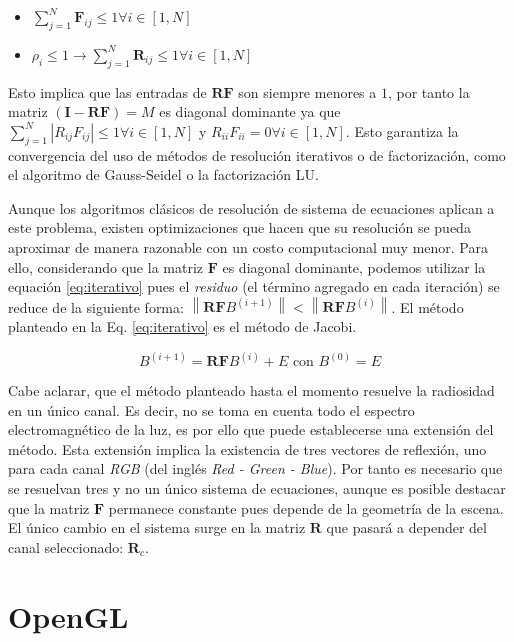\begin{itemize}
	\item $\sum_{j=1}^{N} \mathbf{F}_{ij} \leq 1 \forall{i \in [1,N]}$
	\item $\rho_{i} \leq 1 \rightarrow \sum_{j=1}^{N} \mathbf{R}_{ij} \leq 1 \forall{i \in [1,N]}$
\end{itemize}

Esto implica que las entradas de $\mathbf{RF}$ s\texttt{}on siempre menores a $1$, por tanto la matriz $(\mathbf{I} - \mathbf{RF}) = M$ es diagonal dominante ya que $\sum_{j=1}^{N}|R_{ij}F_{ij}| \le 1 \forall i \in [1, N]$ y $R_{ii}F_{ii} = 0  \forall  i \in [1,N]$. Esto garantiza la convergencia del uso de métodos de resolución iterativos o de factorización, como el algoritmo de Gauss-Seidel o la factorización LU.

Aunque los algoritmos clásicos de resolución de sistema de ecuaciones aplican a este problema, existen optimizaciones que hacen que su resolución se pueda aproximar de manera razonable con un costo computacional muy menor. Para ello, considerando que la matriz $\mathbf{F}$ es diagonal dominante, podemos utilizar la equación \ref{eq:iterativo} pues el \textit{residuo} (el término agregado en cada iteración) se reduce de la siguiente forma: $\left\|\mathbf{RF}B^{(i+1)}\right\| < \left\|\mathbf{RF}B^{(i)}\right\|$. El método planteado en la Eq. \eqref{eq:iterativo} es el método de Jacobi.

\begin{equation}
	B^{(i+1)}  = \mathbf{RF}B^{(i)}  + E \text{ con }  B^{(0)} = E
	\label{eq:iterativo}
\end{equation}

Cabe aclarar, que el método planteado hasta el momento resuelve la radiosidad en un único canal. Es decir, no se toma en cuenta todo el espectro electromagnético de la luz, es por ello que puede establecerse una extensión del método. Esta extensión implica la existencia de tres vectores de reflexión, uno para cada canal \textit{RGB} (del inglés \textit{Red - Green - Blue}). Por tanto es necesario que se resuelvan tres y no un único sistema de ecuaciones, aunque es posible destacar que la matriz $\mathbf{F}$ permanece constante pues depende de la geometría de la escena. El único cambio en el sistema surge en la matriz $\mathbf{R}$ que pasará a depender del canal seleccionado: $\mathbf{R}_{c}$.

\section{OpenGL}

